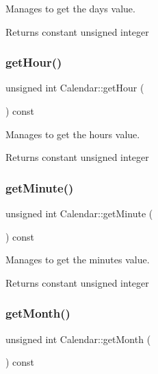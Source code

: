 Manages to get the day\textquotesingle{}s value. 

\begin{DoxyReturn}{Returns}
constant unsigned integer 
\end{DoxyReturn}
\mbox{\label{class_calendar_a292aca906edaeeca39d981917fb87de7}} 
\subsubsection{\texorpdfstring{get\+Hour()}{getHour()}}
{\footnotesize\ttfamily unsigned int Calendar\+::get\+Hour (\begin{DoxyParamCaption}{ }\end{DoxyParamCaption}) const}



Manages to get the hour\textquotesingle{}s value. 

\begin{DoxyReturn}{Returns}
constant unsigned integer 
\end{DoxyReturn}
\mbox{\label{class_calendar_a07c02433f8725c8b052202515023b50a}} 
\subsubsection{\texorpdfstring{get\+Minute()}{getMinute()}}
{\footnotesize\ttfamily unsigned int Calendar\+::get\+Minute (\begin{DoxyParamCaption}{ }\end{DoxyParamCaption}) const}



Manages to get the minute\textquotesingle{}s value. 

\begin{DoxyReturn}{Returns}
constant unsigned integer 
\end{DoxyReturn}
\mbox{\label{class_calendar_a62220669e2fa95a58bb0e5a872aeaa53}} 
\subsubsection{\texorpdfstring{get\+Month()}{getMonth()}}
{\footnotesize\ttfamily unsigned int Calendar\+::get\+Month (\begin{DoxyParamCaption}{ }\end{DoxyParamCaption}) const}



